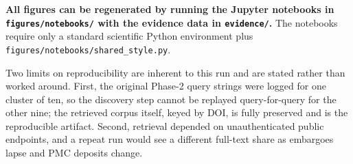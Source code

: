 \documentclass[11pt]{article}
\begin{document}
\textbf{All figures can be regenerated by running the Jupyter notebooks in \texttt{figures/notebooks/} with the evidence data in \texttt{evidence/}.} The notebooks require only a standard scientific Python environment plus \texttt{figures/notebooks/shared\_style.py}.

Two limits on reproducibility are inherent to this run and are stated rather than worked around. First, the original Phase-2 query strings were logged for one cluster of ten, so the discovery step cannot be replayed query-for-query for the other nine; the retrieved corpus itself, keyed by DOI, is fully preserved and is the reproducible artifact. Second, retrieval depended on unauthenticated public endpoints, and a repeat run would see a different full-text share as embargoes lapse and PMC deposits change.




\end{document}
